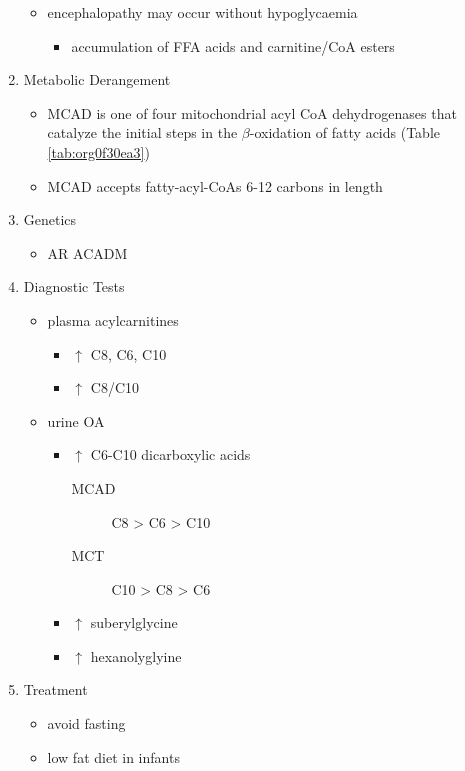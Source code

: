 \documentclass{scrartcl}
\begin{document}
\begin{enumerate}
\begin{itemize}
\item encephalopathy may occur without hypoglycaemia
\begin{itemize}
\item accumulation of FFA acids and carnitine/CoA esters
\end{itemize}
\end{itemize}
\item Metabolic Derangement
\label{sec:org53906d3}
\begin{itemize}
\item MCAD is one of four mitochondrial acyl CoA dehydrogenases that
catalyze the initial steps in the \(\beta\)-oxidation of fatty acids
(Table \ref{tab:org0f30ea3})
\item MCAD accepts fatty-acyl-CoAs 6-12 carbons in length
\end{itemize}

\item Genetics
\label{sec:orgd758d39}
\begin{itemize}
\item AR ACADM
\end{itemize}
\item Diagnostic Tests
\label{sec:orgf53aa33}
\begin{itemize}
\item plasma acylcarnitines
\begin{itemize}
\item \(\uparrow\) C8, C6, C10
\item \(\uparrow\) C8/C10
\end{itemize}
\item urine OA
\begin{itemize}
\item \(\uparrow\) C6-C10 dicarboxylic acids
\begin{description}
\item[{MCAD}] C8 > C6 > C10
\item[{MCT}] C10 > C8 > C6
\end{description}
\item \(\uparrow\) suberylglycine
\item \(\uparrow\) hexanolyglyine
\end{itemize}
\end{itemize}

\item Treatment
\label{sec:org35190a1}
\begin{itemize}
\item avoid fasting
\item low fat diet in infants
\end{itemize}
\end{enumerate}
\end{document}
